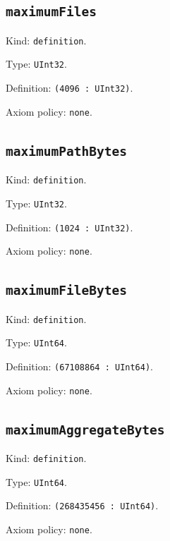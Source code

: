 \documentclass[11pt]{article}
\begin{document}
\subsection*{\texttt{maximumFiles}}
\noindent Kind: \texttt{definition}.\par
\noindent Type: \texttt{UInt32}.\par
\noindent Definition: \texttt{(4096 : UInt32)}.\par
\noindent Axiom policy: \texttt{none}.\par
\subsection*{\texttt{maximumPathBytes}}
\noindent Kind: \texttt{definition}.\par
\noindent Type: \texttt{UInt32}.\par
\noindent Definition: \texttt{(1024 : UInt32)}.\par
\noindent Axiom policy: \texttt{none}.\par
\subsection*{\texttt{maximumFileBytes}}
\noindent Kind: \texttt{definition}.\par
\noindent Type: \texttt{UInt64}.\par
\noindent Definition: \texttt{(67108864 : UInt64)}.\par
\noindent Axiom policy: \texttt{none}.\par
\subsection*{\texttt{maximumAggregateBytes}}
\noindent Kind: \texttt{definition}.\par
\noindent Type: \texttt{UInt64}.\par
\noindent Definition: \texttt{(268435456 : UInt64)}.\par
\noindent Axiom policy: \texttt{none}.\par
\end{document}
